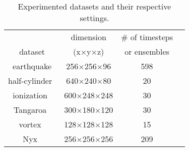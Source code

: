 \begin{table}[htb]
\caption{Experimented datasets and their respective settings.}
\centering
{\scriptsize
\begin{tabular}{c|ccc}
  & dimension & \# of timesteps     \\ 
 dataset & (x$\times$y$\times$z) & or ensembles    \\ \hline
 earthquake &  256$\times$256$\times$96  &  598\\ 
 half-cylinder~\cite{Rojo-TVCG19} &  640$\times$240$\times$80  &  20\\ 
 ionization~\cite{Whalen-TAJ08} & 600$\times$248$\times$248  &    30\\
 Tangaroa~\cite{Popinet-JAOT04} & 300$\times$180$\times$120 &   30\\
 vortex~\cite{silver1997tracking} & 128$\times$128$\times$128 &   15 \\
 Nyx~\cite{Almgren-AJ13}        & 256$\times$256$\times$256 & 209
\end{tabular}
}
\label{tab:datasets}
\end{table}
 
